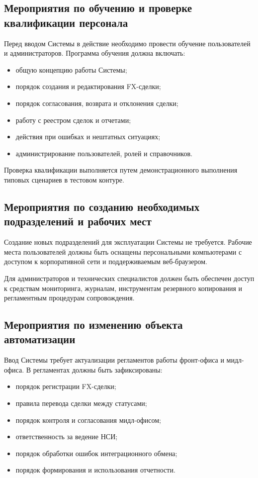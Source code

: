 \documentclass[a4paper,14pt]{extarticle}
\begin{document}
\subsection{Мероприятия по обучению и проверке квалификации персонала}
Перед вводом Системы в действие необходимо провести обучение пользователей и администраторов. Программа обучения должна включать:
\begin{itemize}[itemsep=1mm]
  \item общую концепцию работы Системы;
  \item порядок создания и редактирования FX-сделки;
  \item порядок согласования, возврата и отклонения сделки;
  \item работу с реестром сделок и отчетами;
  \item действия при ошибках и нештатных ситуациях;
  \item администрирование пользователей, ролей и справочников.
\end{itemize}

Проверка квалификации выполняется путем демонстрационного выполнения типовых сценариев в тестовом контуре.

\subsection{Мероприятия по созданию необходимых подразделений и рабочих мест}
Создание новых подразделений для эксплуатации Системы не требуется. Рабочие места пользователей должны быть оснащены персональными компьютерами с доступом к корпоративной сети и поддерживаемым веб-браузером.

Для администраторов и технических специалистов должен быть обеспечен доступ к средствам мониторинга, журналам, инструментам резервного копирования и регламентным процедурам сопровождения.

\subsection{Мероприятия по изменению объекта автоматизации}
Ввод Системы требует актуализации регламентов работы фронт-офиса и мидл-офиса. В регламентах должны быть зафиксированы:
\begin{itemize}[itemsep=1mm]
  \item порядок регистрации FX-сделки;
  \item правила перевода сделки между статусами;
  \item порядок контроля и согласования мидл-офисом;
  \item ответственность за ведение НСИ;
  \item порядок обработки ошибок интеграционного обмена;
  \item порядок формирования и использования отчетности.
\end{itemize}
\end{document}
